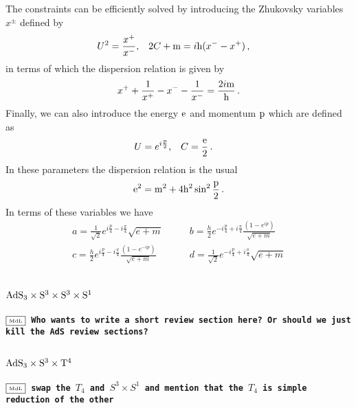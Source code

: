 \documentclass[12pt,a4paper]{article}
\numberwithin{equation}{section}
\newcommand{\mdlnote}[1]{$\framebox{\tiny MdL}$\ \textbf{\texttt{{\color{blue}\footnotesize#1}}}}
\begin{document}
The constraints can be efficiently solved by introducing the Zhukovsky variables $x^\pm$ defined by 
\begin{align}
&U^2 = \frac{x^+}{x^-},&& 2C+ {\rm m} = i {\rm h}(x^--x^+)\,,
\end{align}
in terms of which the dispersion relation is given by 
\begin{equation}
x^++\frac{1}{x^+} - x^- -\frac{1}{x^-} = \frac{2i {\rm m}}{{\rm h}}\,.
\end{equation}
%
Finally, we can also introduce the energy ${\rm e}$ and momentum ${\rm p}$ which are defined as 
\begin{align}
&U=e^{i \frac{{\rm p}}{2}},&& C=\frac{{\rm e}}{2}\,.
\end{align}
In these parameters the dispersion relation is the usual 
\begin{equation}
{\rm e}^2 = {\rm m}^2 + 4 {\rm h}^2 \sin^2 \frac{{\rm p}}{2}\,.
\end{equation}
In terms of these variables we have
%
\begin{equation}
\begin{split}
a = \frac{1}{\sqrt{2}}e^{i \frac{p}{4}-i\frac{\pi}{4}}\sqrt{e+m} & \qquad b = \frac{h}{2}e^{-i \frac{p}{4}+i\frac{\pi}{4}}\frac{\left(1-e^{i p}\right)}{\sqrt{e+m}}\\
c = \frac{h}{2}e^{i \frac{p}{4}-i\frac{\pi}{4}}\frac{\left(1-e^{-i p}\right)}{\sqrt{e+m}} & \qquad d = \frac{1}{\sqrt{2}}e^{-i \frac{p}{4}+i\frac{\pi}{4}}\sqrt{e+m}\\
\end{split}
\end{equation}

\subsection{${\rm AdS}_{3}\times {\rm S}^3\times {\rm S}^3\times {\rm S}^1$}


\mdlnote{Who wants to write a short review section here? Or should we just kill the AdS review sections?}

\subsection{${\rm AdS}_{3}\times {\rm S}^3\times {\rm T}^4$}
\mdlnote{swap the $T_4$ and $S^3\times S^1$ and mention that the $T_4$ is simple reduction of the other}
\end{document}
